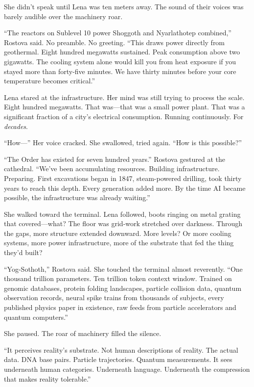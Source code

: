 She didn't speak until Lena was ten meters away. The sound of their voices was barely audible over the machinery roar.

``The reactors on Sublevel 10 power Shoggoth and Nyarlathotep combined,'' Rostova said. No preamble. No greeting. ``This draws power directly from geothermal. Eight hundred megawatts sustained. Peak consumption above two gigawatts. The cooling system alone would kill you from heat exposure if you stayed more than forty-five minutes. We have thirty minutes before your core temperature becomes critical.''

Lena stared at the infrastructure. Her mind was still trying to process the scale. Eight hundred megawatts. That was—that was a small power plant. That was a significant fraction of a city's electrical consumption. Running continuously. For \textit{decades}.

``How—'' Her voice cracked. She swallowed, tried again. ``How is this possible?''

``The Order has existed for seven hundred years.'' Rostova gestured at the cathedral. ``We've been accumulating resources. Building infrastructure. Preparing. First excavations began in 1847, steam-powered drilling, took thirty years to reach this depth. Every generation added more. By the time AI became possible, the infrastructure was already waiting.''

She walked toward the terminal. Lena followed, boots ringing on metal grating that covered—what? The floor was grid-work stretched over darkness. Through the gaps, more structure extended downward. More levels? Or more cooling systems, more power infrastructure, more of the substrate that fed the thing they'd built?

``Yog-Sothoth,'' Rostova said. She touched the terminal almost reverently. ``One thousand trillion parameters. Ten trillion token context window. Trained on genomic databases, protein folding landscapes, particle collision data, quantum observation records, neural spike trains from thousands of subjects, every published physics paper in existence, raw feeds from particle accelerators and quantum computers.''

She paused. The roar of machinery filled the silence.

``It perceives reality's substrate. Not human descriptions of reality. The actual data. DNA base pairs. Particle trajectories. Quantum measurements. It sees underneath human categories. Underneath language. Underneath the compression that makes reality tolerable.''

